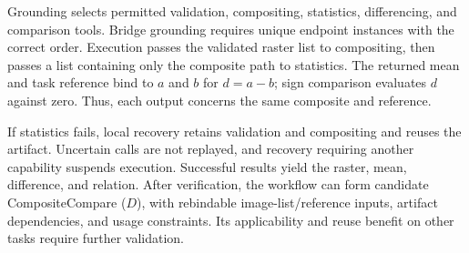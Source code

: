 Grounding selects permitted validation, compositing, statistics, differencing, and comparison tools. Bridge grounding requires unique endpoint instances with the correct order. Execution passes the validated raster list to compositing, then passes a list containing only the composite path to statistics. The returned mean and task reference bind to $a$ and $b$ for $d=a-b$; sign comparison evaluates $d$ against zero. Thus, each output concerns the same composite and reference.

If statistics fails, local recovery retains validation and compositing and reuses the artifact. Uncertain calls are not replayed, and recovery requiring another capability suspends execution. Successful results yield the raster, mean, difference, and relation. After verification, the workflow can form candidate CompositeCompare ($D$), with rebindable image-list/reference inputs, artifact dependencies, and usage constraints. Its applicability and reuse benefit on other tasks require further validation.

